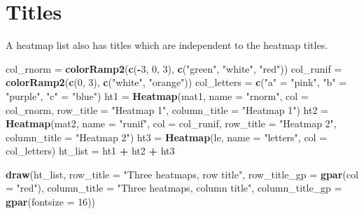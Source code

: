 \documentclass[]{book}
\newenvironment{Shaded}{\begin{snugshade}}{\end{snugshade}}
\newcommand{\KeywordTok}[1]{\textcolor[rgb]{0.13,0.29,0.53}{\textbf{#1}}}
\newcommand{\DataTypeTok}[1]{\textcolor[rgb]{0.13,0.29,0.53}{#1}}
\newcommand{\DecValTok}[1]{\textcolor[rgb]{0.00,0.00,0.81}{#1}}
\newcommand{\StringTok}[1]{\textcolor[rgb]{0.31,0.60,0.02}{#1}}
\newcommand{\OperatorTok}[1]{\textcolor[rgb]{0.81,0.36,0.00}{\textbf{#1}}}
\newcommand{\NormalTok}[1]{#1}
\theoremstyle{definition}
\theoremstyle{definition}
\theoremstyle{definition}
\theoremstyle{remark}
\begin{document}
\section{Titles}\label{titles}

A heatmap list also has titles which are independent to the heatmap
titles.

\begin{Shaded}
\begin{Highlighting}[]
\NormalTok{col_rnorm =}\StringTok{ }\KeywordTok{colorRamp2}\NormalTok{(}\KeywordTok{c}\NormalTok{(}\OperatorTok{-}\DecValTok{3}\NormalTok{, }\DecValTok{0}\NormalTok{, }\DecValTok{3}\NormalTok{), }\KeywordTok{c}\NormalTok{(}\StringTok{"green"}\NormalTok{, }\StringTok{"white"}\NormalTok{, }\StringTok{"red"}\NormalTok{))}
\NormalTok{col_runif =}\StringTok{ }\KeywordTok{colorRamp2}\NormalTok{(}\KeywordTok{c}\NormalTok{(}\DecValTok{0}\NormalTok{, }\DecValTok{3}\NormalTok{), }\KeywordTok{c}\NormalTok{(}\StringTok{"white"}\NormalTok{, }\StringTok{"orange"}\NormalTok{))}
\NormalTok{col_letters =}\StringTok{ }\KeywordTok{c}\NormalTok{(}\StringTok{"a"}\NormalTok{ =}\StringTok{ "pink"}\NormalTok{, }\StringTok{"b"}\NormalTok{ =}\StringTok{ "purple"}\NormalTok{, }\StringTok{"c"}\NormalTok{ =}\StringTok{ "blue"}\NormalTok{)}
\NormalTok{ht1 =}\StringTok{ }\KeywordTok{Heatmap}\NormalTok{(mat1, }\DataTypeTok{name =} \StringTok{"rnorm"}\NormalTok{, }\DataTypeTok{col =}\NormalTok{ col_rnorm,}
    \DataTypeTok{row_title =} \StringTok{"Heatmap 1"}\NormalTok{, }\DataTypeTok{column_title =} \StringTok{"Heatmap 1"}\NormalTok{)}
\NormalTok{ht2 =}\StringTok{ }\KeywordTok{Heatmap}\NormalTok{(mat2, }\DataTypeTok{name =} \StringTok{"runif"}\NormalTok{, }\DataTypeTok{col =}\NormalTok{ col_runif,}
    \DataTypeTok{row_title =} \StringTok{"Heatmap 2"}\NormalTok{, }\DataTypeTok{column_title =} \StringTok{"Heatmap 2"}\NormalTok{)}
\NormalTok{ht3 =}\StringTok{ }\KeywordTok{Heatmap}\NormalTok{(le, }\DataTypeTok{name =} \StringTok{"letters"}\NormalTok{, }\DataTypeTok{col =}\NormalTok{ col_letters)}
\NormalTok{ht_list =}\StringTok{ }\NormalTok{ht1 }\OperatorTok{+}\StringTok{ }\NormalTok{ht2 }\OperatorTok{+}\StringTok{ }\NormalTok{ht3}

\KeywordTok{draw}\NormalTok{(ht_list, }\DataTypeTok{row_title =} \StringTok{"Three heatmaps, row title"}\NormalTok{, }\DataTypeTok{row_title_gp =} \KeywordTok{gpar}\NormalTok{(}\DataTypeTok{col =} \StringTok{"red"}\NormalTok{),}
    \DataTypeTok{column_title =} \StringTok{"Three heatmaps, column title"}\NormalTok{, }\DataTypeTok{column_title_gp =} \KeywordTok{gpar}\NormalTok{(}\DataTypeTok{fontsize =} \DecValTok{16}\NormalTok{))}
\end{Highlighting}
\end{Shaded}
\end{document}
